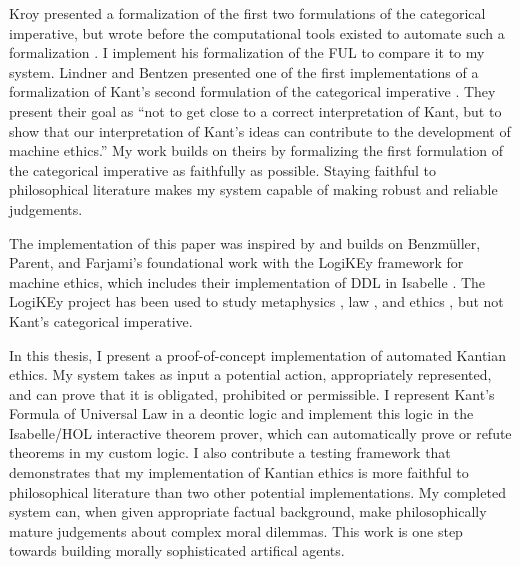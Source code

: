 \begin{isabellebody}
\begin{isamarkuptext}
Kroy presented a formalization of the first two formulations of the categorical imperative, but wrote 
before the computational tools existed to automate such a formalization \citep{kroy}. I implement his formalization of the FUL to compare it to my system. 
Lindner and Bentzen presented one of the first implementations of a formalization of 
Kant's second formulation of the categorical imperative \citep{BL}. They present their goal as ``not to get 
close to a correct interpretation of Kant, but to show that our interpretation of Kant’s ideas can 
contribute to the development of machine ethics.'' My work builds on theirs by formalizing the 
first formulation of the categorical imperative as faithfully as possible. Staying faithful to 
philosophical literature makes my system capable of making robust and reliable judgements. 

The implementation of this paper was inspired by and builds on Benzmüller, Parent, and Farjami's 
foundational work with the LogiKEy framework for machine ethics, which includes their implementation 
of DDL in Isabelle \citep{BFP, logikey}. The LogiKEy project has been used to study metaphysics 
\citep{godel, metaphysics1}, law \citep{constitution}, and ethics \citep{gewirth}, but not 
Kant's categorical imperative.%
\end{isamarkuptext}\isamarkuptrue%
%
\isadelimdocument
%
\endisadelimdocument
%
\isatagdocument
%
\isamarkuptrue%
%
\endisatagdocument
{\isafolddocument}%
%
\isadelimdocument
%
\endisadelimdocument
%
\begin{isamarkuptext}%
In this thesis, I present a proof-of-concept implementation of automated Kantian ethics. My system
takes as input a potential action, appropriately represented, and can prove that it is obligated, 
prohibited or permissible. I represent Kant's Formula of Universal Law in a deontic logic and 
implement this logic in the Isabelle/HOL interactive theorem prover, which can automatically prove or 
refute theorems in my custom logic. I also contribute a testing framework that demonstrates that
my implementation of Kantian ethics is more faithful to philosophical literature than two other 
potential implementations. My completed system can, when given appropriate factual background, make
philosophically mature judgements about complex moral dilemmas. This work is one step towards building 
morally sophisticated artifical agents.


\end{isamarkuptext}
\end{isabellebody}
